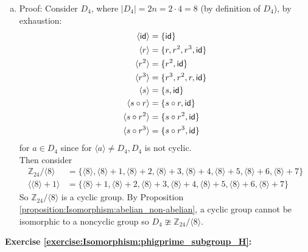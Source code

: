 \begin{enumerate}[(a)]
\item
Proof: Consider $D_4$, where $|D_4| = 2n = 2 \cdot 4 = 8$    (by definition of $D_4$), by exhaustion:
\begin{align*}
\langle \sf{id} \rangle &= \{\sf{id}\}
\\
\langle r \rangle &= \{r, r^2, r^3, \sf{id}\}
\\
\langle r^2 \rangle &= \{r^2, \sf{id}\}
\\
\langle r^3 \rangle &= \{r^3, r^2, r, \sf{id}\}
\\
\langle s \rangle &= \{s, \sf{id}\}
\\
\langle s \circ r \rangle &= \{ s \circ r, \sf{id}\}
\\
\langle s \circ r^2 \rangle &= \{s \circ r^2, \sf{id}\}
\\
\langle s \circ r^3 \rangle &= \{s \circ r^3, \sf{id}\}
\end{align*}
for $a \in D_4$ since for $\langle a \rangle \neq D_4, D_4$ is not cyclic.
\\
Then consider 
\begin{align*}
{\mathbb Z}_{24} / \langle 8 \rangle &= \{ \langle 8 \rangle, \langle 8 \rangle + 1, \langle 8 \rangle + 2, \langle 8 \rangle + 3, \langle 8 \rangle + 4, \langle 8 \rangle + 5, \langle 8 \rangle + 6, \langle 8 \rangle + 7\}
\\
\langle \langle 8 \rangle + 1 \rangle &= \{ \langle 8 \rangle + 1, \langle 8 \rangle + 2, \langle 8 \rangle + 3, \langle 8 \rangle + 4, \langle 8 \rangle + 5, \langle 8 \rangle + 6, \langle 8 \rangle + 7\}
\end{align*}
So ${\mathbb Z}_{24} / \langle 8 \rangle$ is a cyclic group. By Proposition \ref{proposition:Isomorphism:abelian_non-abelian}, a cyclic group cannot be isomorphic to a noncyclic group so  $D_4 \ncong {\mathbb Z}_{24} / \langle 8 \rangle$.
\end{enumerate}

\noindent\textbf{Exercise \ref{exercise:Isomorphism:phigprime_subgroup_H}:}

